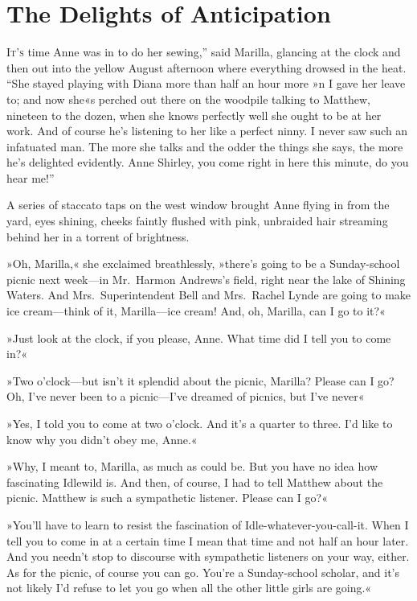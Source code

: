 \chapter{The Delights of Anticipation}

\lettrine[ante=“,lines=4]{I}{t's} time Anne was in to do her sewing,” said Marilla, glancing at the clock and then out into the yellow August afternoon where everything drowsed in the heat. “She stayed playing with Diana more than half an hour more »n I gave her leave to; and now she«s perched out there on the woodpile talking to Matthew, nineteen to the dozen, when she knows perfectly well she ought to be at her work. And of course he's listening to her like a perfect ninny. I never saw such an infatuated man. The more she talks and the odder the things she says, the more he's delighted evidently. Anne Shirley, you come right in here this minute, do you hear me!”

A series of staccato taps on the west window brought Anne flying in from the yard, eyes shining, cheeks faintly flushed with pink, unbraided hair streaming behind her in a torrent of brightness.

»Oh, Marilla,« she exclaimed breathlessly, »there's going to be a Sunday-school picnic next week—in Mr.~Harmon Andrews's field, right near the lake of Shining Waters. And Mrs.~Superintendent Bell and Mrs.~Rachel Lynde are going to make ice cream—think of it, Marilla—ice cream! And, oh, Marilla, can I go to it?«

»Just look at the clock, if you please, Anne. What time did I tell you to come in?«

»Two o'clock—but isn't it splendid about the picnic, Marilla? Please can I go? Oh, I've never been to a picnic—I've dreamed of picnics, but I've never\longdash«

»Yes, I told you to come at two o'clock. And it's a quarter to three. I'd like to know why you didn't obey me, Anne.«

»Why, I meant to, Marilla, as much as could be. But you have no idea how fascinating Idlewild is. And then, of course, I had to tell Matthew about the picnic. Matthew is such a sympathetic listener. Please can I go?«

»You'll have to learn to resist the fascination of Idle-whatever-you-call-it. When I tell you to come in at a certain time I mean that time and not half an hour later. And you needn't stop to discourse with sympathetic listeners on your way, either. As for the picnic, of course you can go. You're a Sunday-school scholar, and it's not likely I'd refuse to let you go when all the other little girls are going.«

